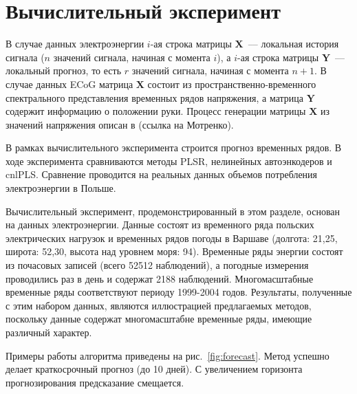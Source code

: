 \documentclass[12pt,twoside]{article}
\newcommand{\bY}{\mathbf{Y}}
\newcommand{\bX}{\mathbf{X}}
\begin{document}
\section{Вычислительный эксперимент}

В случае данных электроэнергии $i$-ая строка  матрицы $\bX$~--– локальная история сигнала ($n$ значений сигнала, начиная с момента $i$), а $i$-ая строка матрицы $\bY$~--– локальный прогноз, то есть $r$ значений сигнала, начиная с момента $n+1$. В случае данных ECoG матрица $\bX$ состоит из пространственно-временного спектрального представления временных рядов напряжения, а матрица $\bY$ содержит информацию о положении руки. Процесс генерации матрицы $\bX$ из значений напряжения описан в (ссылка на Мотренко). 

В рамках вычислительного эксперимента строится прогноз временных рядов. В ходе эксперимента сравниваются методы PLSR, нелинейных автоэнкодеров и cnlPLS. Сравнение проводится на реальных данных объемов потребления электроэнергии в Польше. 

Вычислительный эксперимент, продемонстрированный в этом разделе, основан на данных электроэнергии. Данные состоят из временного ряда польских электрических нагрузок и временных рядов погоды в Варшаве (долгота: 21,25, широта: 52,30, высота над уровнем моря: 94). Временные ряды энергии состоят из почасовых записей (всего 52512 наблюдений), а погодные измерения проводились раз в день и содержат 2188 наблюдений. Многомасштабные временные ряды соответствуют периоду 1999-2004 годов. Результаты, полученные с этим набором данных, являются иллюстрацией предлагаемых методов, поскольку данные содержат многомасштабне временные ряды, имеющие различный характер.

Примеры работы алгоритма приведены на рис.~\ref{fig:forecast}. Метод успешно делает краткосрочный прогноз (до 10 дней). С увеличением горизонта прогнозирования предсказание смещается. 


\end{document}
